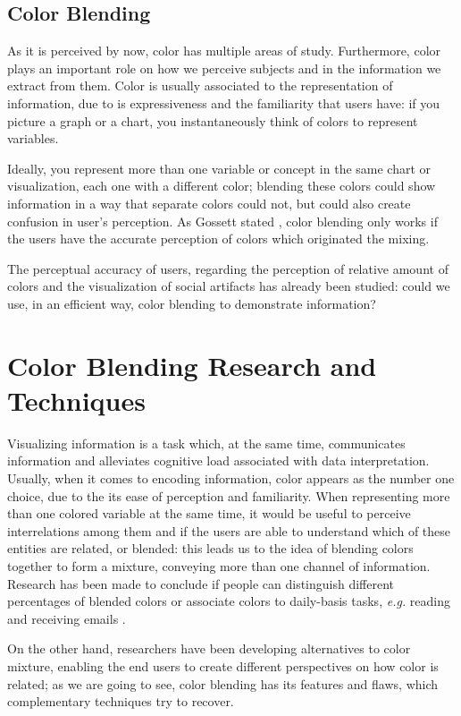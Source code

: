 \documentclass{report}
\begin{document}
\subsection{Color Blending}
As it is perceived by now, color has multiple areas of study. Furthermore, color plays an important role
on how we perceive subjects and in the information we extract from them. Color is usually associated to
the representation of information, due to is expressiveness and the familiarity that users have: if you
picture a graph or a chart, you instantaneously think of colors to represent variables. \par
Ideally, you represent more than one variable or concept in the same chart or visualization, each one
with a different color; blending these colors could show information in a way that separate colors could
not, but could also create confusion in user’s perception. As Gossett stated \cite{Gossett2004}, color blending only
works if the users have the accurate perception of colors which originated the mixing. \par
The perceptual accuracy of users, regarding the perception of relative amount of colors and the visualization
of social artifacts has already been studied: could we use, in an efficient way, color blending to demonstrate
information? 
%
\section{Color Blending Research and Techniques}
Visualizing information is a task which, at the same time, communicates information and alleviates
cognitive load associated with data interpretation. Usually, when it comes to encoding information, color
appears as the number one choice, due to the its ease of perception and familiarity. When representing
more than one colored variable at the same time, it would be useful to perceive interrelations among
them and if the users are able to understand which of these entities are related, or blended: this leads
us to the idea of blending colors together to form a mixture, conveying more than one channel of information.
Research has been made to conclude if people can distinguish different percentages of blended colors or
associate colors to daily-basis tasks, \emph{e.g.} reading and receiving emails \cite{Gama20143}. \par
On the other hand, researchers have been developing alternatives to color mixture, enabling the end users
to create different perspectives on how color is related; as we are going to see, color blending has its
features and flaws, which complementary techniques try to recover. \par
%
\end{document}
